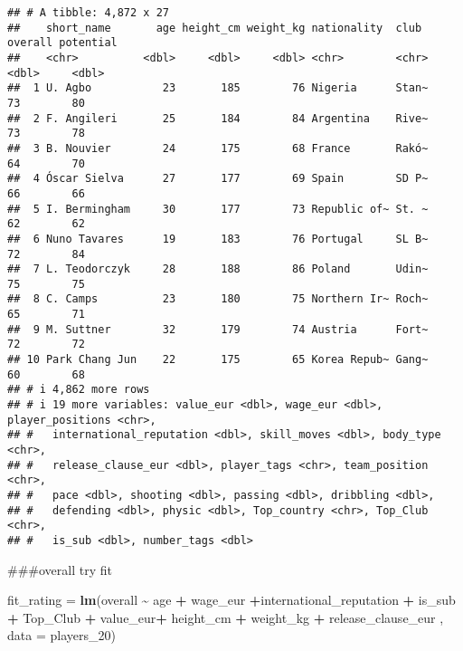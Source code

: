 \documentclass[
]{article}
\newenvironment{Shaded}{\begin{snugshade}}{\end{snugshade}}
\newcommand{\AttributeTok}[1]{\textcolor[rgb]{0.13,0.29,0.53}{#1}}
\newcommand{\DecValTok}[1]{\textcolor[rgb]{0.00,0.00,0.81}{#1}}
\newcommand{\FunctionTok}[1]{\textcolor[rgb]{0.13,0.29,0.53}{\textbf{#1}}}
\newcommand{\NormalTok}[1]{#1}
\newcommand{\OtherTok}[1]{\textcolor[rgb]{0.56,0.35,0.01}{#1}}
\newcommand{\SpecialCharTok}[1]{\textcolor[rgb]{0.81,0.36,0.00}{\textbf{#1}}}
\newcommand{\StringTok}[1]{\textcolor[rgb]{0.31,0.60,0.02}{#1}}
\begin{document}
\begin{verbatim}
## # A tibble: 4,872 x 27
##    short_name       age height_cm weight_kg nationality  club  overall potential
##    <chr>          <dbl>     <dbl>     <dbl> <chr>        <chr>   <dbl>     <dbl>
##  1 U. Agbo           23       185        76 Nigeria      Stan~      73        80
##  2 F. Angileri       25       184        84 Argentina    Rive~      73        78
##  3 B. Nouvier        24       175        68 France       Rakó~      64        70
##  4 Óscar Sielva      27       177        69 Spain        SD P~      66        66
##  5 I. Bermingham     30       177        73 Republic of~ St. ~      62        62
##  6 Nuno Tavares      19       183        76 Portugal     SL B~      72        84
##  7 L. Teodorczyk     28       188        86 Poland       Udin~      75        75
##  8 C. Camps          23       180        75 Northern Ir~ Roch~      65        71
##  9 M. Suttner        32       179        74 Austria      Fort~      72        72
## 10 Park Chang Jun    22       175        65 Korea Repub~ Gang~      60        68
## # i 4,862 more rows
## # i 19 more variables: value_eur <dbl>, wage_eur <dbl>, player_positions <chr>,
## #   international_reputation <dbl>, skill_moves <dbl>, body_type <chr>,
## #   release_clause_eur <dbl>, player_tags <chr>, team_position <chr>,
## #   pace <dbl>, shooting <dbl>, passing <dbl>, dribbling <dbl>,
## #   defending <dbl>, physic <dbl>, Top_country <chr>, Top_Club <chr>,
## #   is_sub <dbl>, number_tags <dbl>
\end{verbatim}

\#\#\#overall try fit

\begin{Shaded}
\begin{Highlighting}[]
\NormalTok{fit\_rating }\OtherTok{=} \FunctionTok{lm}\NormalTok{(overall }\SpecialCharTok{\textasciitilde{}}\NormalTok{ age }\SpecialCharTok{+}\NormalTok{ wage\_eur }\SpecialCharTok{+}\NormalTok{international\_reputation }\SpecialCharTok{+}\NormalTok{ is\_sub }
                          \SpecialCharTok{+}\NormalTok{ Top\_Club }\SpecialCharTok{+}\NormalTok{ value\_eur}\SpecialCharTok{+}\NormalTok{ height\_cm }\SpecialCharTok{+}\NormalTok{ weight\_kg }\SpecialCharTok{+}\NormalTok{ release\_clause\_eur}
\NormalTok{                          , }\AttributeTok{data =}\NormalTok{ players\_20)}
\end{Highlighting}
\end{Shaded}

\begin{Shaded}
\end{Shaded}
\end{document}
